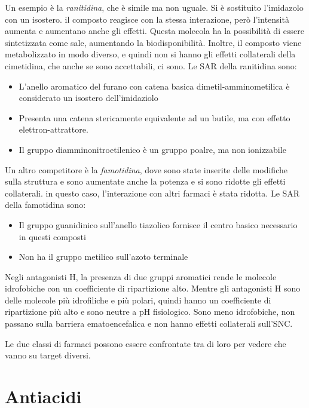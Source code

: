 Un esempio è la \emph{ranitidina}, che è simile ma non uguale. 
Si è sostituito l'imidazolo con un isostero. il composto reagisce con la stessa
interazione, però l'intensità aumenta e aumentano anche gli effetti.
Questa molecola ha la possibilità di essere sintetizzata come sale,
aumentando la biodisponibilità.
Inoltre, il composto viene metabolizzato in modo diverso, e quindi non
si hanno gli effetti collaterali della cimetidina, che anche se sono
accettabili, ci sono.
Le SAR della ranitidina sono:
\begin{itemize}
  \item L'anello aromatico del furano con catena basica dimetil-amminometilica è considerato un isostero dell'imidaziolo 
  \item  Presenta una catena stericamente equivalente ad un butile, ma con effetto elettron-attrattore.
  \item Il gruppo diamminonitroetilenico è un gruppo poalre, ma non ionizzabile
\end{itemize}

Un altro competitore è la \emph{famotidina}, dove sono state inserite delle
modifiche sulla struttura e sono aumentate anche la potenza e si sono
ridotte gli effetti collaterali. in questo caso, l'interazione con altri
farmaci è stata ridotta.
Le SAR della famotidina sono:
\begin{itemize}
  \item Il gruppo guanidinico sull'anello tiazolico fornisce il centro basico necessario in questi composti
  \item Non ha il gruppo metilico sull'azoto terminale
\end{itemize}

Negli antagonisti H, la presenza di due gruppi aromatici rende le molecole
idrofobiche con un coefficiente di ripartizione alto.
Mentre gli antagonisti H sono delle molecole più idrofiliche e più
polari, quindi hanno un coefficiente di ripartizione più alto e sono
neutre a pH fisiologico. Sono meno idrofobiche, non passano sulla
barriera ematoencefalica e non hanno effetti collaterali sull'SNC.

Le due classi di farmaci possono essere confrontate tra di loro per vedere che vanno su target diversi.


\section{Antiacidi}





